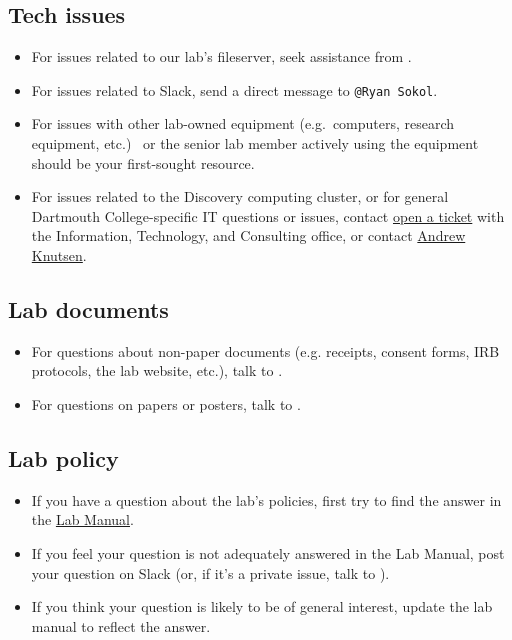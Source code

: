\documentclass{tufte-book} %
\newcommand{\ourschool}{Dartmouth College}
\begin{document}
\subsection{Tech issues}
\begin{itemize}
\item For issues related to our lab's fileserver, seek assistance from
  \director.

\item For issues related to Slack, send a direct message to \texttt{@Ryan Sokol}.

\item For issues with other lab-owned equipment (e.g.~computers,
  research equipment, etc.) \coordinator~or the senior lab member
  actively using the equipment should be your first-sought resource.

\item For issues related to the Discovery computing cluster, or for general \ourschool-specific IT questions or issues, contact
  \href{help@dartmouth.edu}{open a ticket} with the Information,
  Technology, and Consulting office, or contact
  \href{mailto:Andrew.C.Knutsen@Dartmouth.edu}{Andrew Knutsen}.
\end{itemize}

\subsection{Lab documents}
\begin{itemize}
\item For questions about non-paper documents (e.g. receipts, consent
  forms, IRB protocols, the lab website, etc.), talk to \coordinator.

\item For questions on papers or posters, talk to \director.
\end{itemize}

\subsection{Lab policy}
\begin{itemize}
\item If you have a question about the lab's policies, first try to
  find the answer in the
  \href{https://github.com/ContextLab/lab-manual/tree/master/lab_manual.pdf}{Lab
    Manual}.

\item If you feel your question is not adequately answered in the Lab
  Manual, post your question on Slack (or, if it's a private issue,
  talk to \director).

\item If you think your question is likely to be of general interest,
  update the lab manual to reflect the answer.
\end{itemize}
\end{document}
